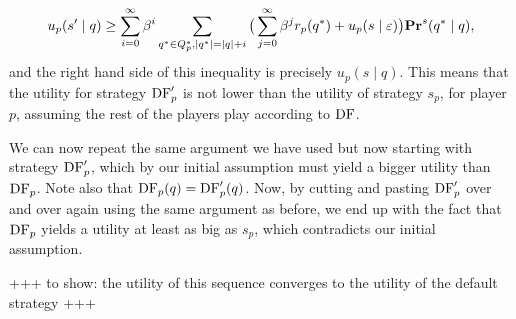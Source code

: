 $$u_p(s' \mid q) \geq \sum_{i=0}^\infty \beta^i \sum_{q^* \in Q^*_p, |q^*| = |q| + i} \big(\sum_{j = 0}^\infty \beta^j r_p(q^*) + u_p(s \mid \varepsilon)\big)  \mathbf{Pr}^s(q^* \mid q), $$
and the right hand side of this inequality is precisely $u_p(s \mid q)$. This means that the utility for strategy $\text{\rm DF}'_p$ is not lower than the utility of strategy $s_p$, for player $p$, assuming the rest of the players play according to $\text{\rm DF}$. 

We can now repeat the same argument we have used but now starting with strategy $\text{\rm DF}'_p$, which by our initial assumption must yield 
a bigger utility than $\text{\rm DF}_p$. Note also that $\text{\rm DF}_p(q) = \text{\rm DF}_p'(q)$. 
Now, by cutting and pasting $\text{\rm DF}'_p$ over and over again using the same argument as before, we end up with the fact that $\text{\rm DF}_p$ yields 
a utility at least as big as $s_p$, which contradicts our initial assumption. 

+++ to show: the utility of this sequence converges to the utility of the default strategy +++








